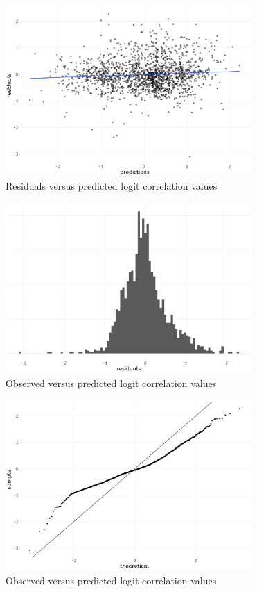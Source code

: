 \documentclass[]{elsarticle} %
\begin{document}
\begin{figure}
  \includegraphics[width=\columnwidth, height = 6.5cm]{figures/residuals-predicted}
    \caption{Residuals versus predicted logit correlation values}
    \label{fig:residuals-pred}
\end{figure}

\begin{figure}
  \includegraphics[width=\columnwidth, height = 6.5cm]{figures/residuals-hist}
    \caption{Observed versus predicted logit correlation values}
    \label{fig:residuals-hist}
\end{figure}

\begin{figure}
  \includegraphics[width=\columnwidth, height = 6.5cm]{figures/residuals-qq}
    \caption{Observed versus predicted logit correlation values}
    \label{fig:residuals-qq}
\end{figure}
\end{document}
